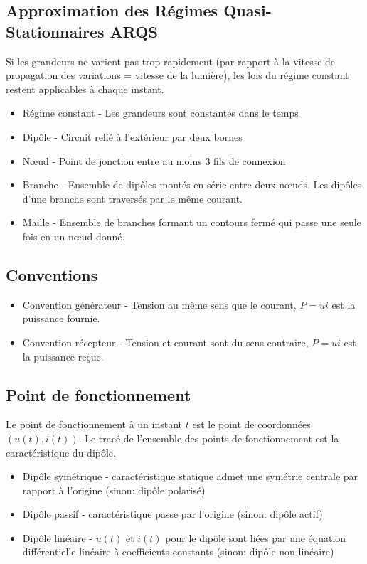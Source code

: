 \documentclass[openany]{book}
\begin{document}
\subsection{Approximation des Régimes Quasi-Stationnaires ARQS}
Si les grandeurs ne varient pas trop rapidement (par rapport à la vitesse de propagation des variations = vitesse de la lumière), les lois du régime constant restent applicables à chaque instant.
\begin{itemize}
    \item Régime constant - Les grandeurs sont constantes dans le temps
    \item Dipôle - Circuit relié à l'extérieur par deux bornes 
    \item Nœud - Point de jonction entre au moins 3 fils de connexion
    \item Branche - Ensemble de dipôles montés en série entre deux nœuds. Les dipôles d'une branche sont traversés par le même courant.
    \item Maille - Ensemble de branches formant un contours fermé qui passe une seule fois en un nœud donné. 
\end{itemize}

\subsection{Conventions}
\begin{itemize}
    \item Convention générateur - Tension au même sens que le courant, $P = ui$ est la puissance fournie. 
    \item Convention récepteur - Tension et courant sont du sens contraire, $P = ui$ est la puissance reçue. 
\end{itemize}

\subsection{Point de fonctionnement}
Le point de fonctionnement à un instant $t$ est le point de coordonnées $(u(t), i(t))$. Le tracé de l'ensemble des points de fonctionnement est la caractéristique du dipôle. 

\begin{itemize}
    \item Dipôle symétrique - caractéristique statique admet une symétrie centrale par rapport à l'origine (sinon: dipôle polarisé)
    \item Dipôle passif - caractéristique passe par l'origine (sinon: dipôle actif)
    \item Dipôle linéaire - $u(t)$ et $i(t)$ pour le dipôle sont liées par une équation différentielle linéaire à coefficients constants (sinon: dipôle non-linéaire)
    
\end{itemize}
\end{document}
